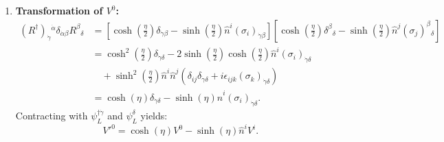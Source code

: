 \documentclass[11pt,a4paper]{article}
\begin{document}
\begin{enumerate}
    \item \textbf{Transformation of $V^0$:}
    \begin{align}
        (R^\dagger)_{\dot{\gamma}}{}^{\dot{\alpha}}\delta_{\dot{\alpha}\beta}R^\beta{}_\delta &= \left[\cosh\left(\frac{\eta}{2}\right)\delta_{\dot{\gamma}\beta} - \sinh\left(\frac{\eta}{2}\right)\hat{n}^i(\sigma_i)_{\dot{\gamma}\beta}\right]\left[\cosh\left(\frac{\eta}{2}\right)\delta^\beta{}_\delta - \sinh\left(\frac{\eta}{2}\right)\hat{n}^j(\sigma_j)^\beta{}_\delta\right] \nonumber \\
        &= \cosh^2\left(\frac{\eta}{2}\right)\delta_{\dot{\gamma}\delta} - 2\sinh\left(\frac{\eta}{2}\right)\cosh\left(\frac{\eta}{2}\right)\hat{n}^i(\sigma_i)_{\dot{\gamma}\delta} \nonumber \\
        &\quad + \sinh^2\left(\frac{\eta}{2}\right)\hat{n}^i\hat{n}^j\left(\delta_{ij}\delta_{\dot{\gamma}\delta} + i\epsilon_{ijk}(\sigma_k)_{\dot{\gamma}\delta}\right) \nonumber \\
        &= \cosh(\eta)\delta_{\dot{\gamma}\delta} - \sinh(\eta)\hat{n}^i(\sigma_i)_{\dot{\gamma}\delta}.
    \end{align}
    Contracting with $\psi_L^{\dagger\dot{\gamma}}$ and $\psi_L^\delta$ yields:
    \begin{equation}
        V'^0 = \cosh(\eta)V^0 - \sinh(\eta)\hat{n}^i V^i.
    \end{equation}


\end{enumerate}
\end{document}
